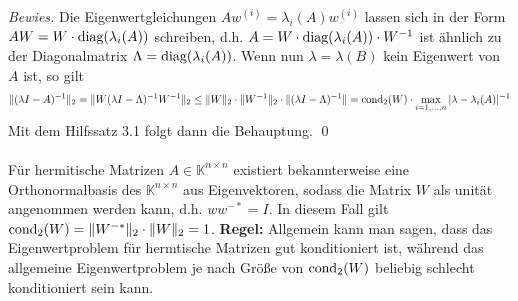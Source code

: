 \documentclass{article}
\begin{document}
    \textit{Bewies.} Die Eigenwertgleichungen $Aw^{(i)}=\lambda_i(A)w^{(i)}$ lassen sich in der Form 
    $AW=W\cdot\text{diag}(\lambda_i(A))$ schreiben, d.h. $A=W\cdot\text{diag}(\lambda_i(A))\cdot W^{-1}$ ist ähnlich zu der 
    Diagonalmatrix $\Lambda = \text{diag}(\lambda_i(A))$. Wenn nun $\lambda=\lambda(B)$ kein Eigenwert von $A$ ist, so gilt 
    \[\|(\lambda I - A)^{-1}\|_2 = \|W(\lambda I - \Lambda)^{-1}W^{-1}\|_2 
    \leq \|W\|_2\cdot\|W^{-1}\|_2\cdot\|(\lambda I-\Lambda)^{-1}\| 
    = \text{cond}_2(W)\cdot \max_{i=1,\dotsc,n} |\lambda-\lambda_i(A)|^{-1}\]
    Mit dem Hilfssatz 3.1 folgt dann die Behauptung. \qed \\ \\
    Für hermitische Matrizen $A\in\mathbb{K}^{n\times n}$ existiert bekannterweise eine Orthonormalbasis des 
    $\mathbb{K}^{n\times n}$ aus Eigenvektoren, sodass die Matrix $W$ als unität angenommen werden kann, 
    d.h. $ww^{-*}=I$. In diesem Fall gilt $\text{cond}_2(W)=\|W^{-*}\|_2\cdot\|W\|_2 = 1$.
    \textbf{Regel:} Allgemein kann man sagen, dass das Eigenwertproblem für hermtische Matrizen gut konditioniert
    ist, während das allgemeine Eigenwertproblem je nach Größe von $\text{cond}_2(W)$ beliebig schlecht konditioniert 
    sein kann.
\end{document}
